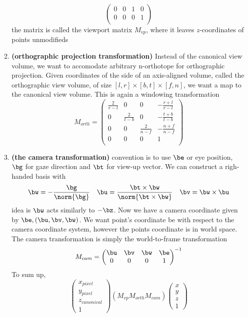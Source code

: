 \documentclass[11pt]{article}
\newcommand{\bheading}[1]{\textbf{(#1)}}
\begin{document}
\begin{enumerate}
\[\begin{pmatrix}
            0 & 0 & 1 & 0 \\
            0 & 0 & 0 & 1 \\
        \end{pmatrix}
    \]
    the matrix is called the viewport matrix $M_{vp}$, where it leaves $z$-coordinates of points unmodifieds
    \item \bheading{orthographic projection transformation} Instead of the canonical view volume, we want to accomodate arbitrary n-orthotope for orthographic projection. Given coordinates of the side of an axis-aligned volume, called the orthographic view volume, of size $[l,r] \times [b,t] \times [f,n]$, we want a map to the canonical view volume. This is again a windowing transformation
    \[
        M_{orth} = 
        \begin{pmatrix}
            \frac{2}{r-l} & 0 & 0 & -\frac{r+l}{r-l} \\
            0 & \frac{2}{t-b} & 0 & -\frac{t+b}{t-b} \\
            0 & 0 & \frac{2}{n-f} & -\frac{n+f}{n-f} \\
            0 & 0 & 0 & 1 \\
        \end{pmatrix}
    \]
    \item \bheading{the camera transformation} convention is to use $\be$ or eye position, $\bg$ for gaze direction and $\bt$ for view-up vector. We can construct a righ-handed basis with 
    \[
        \bw = -\frac{\bg}{\norm{\bg}}
        \quad 
        \bu = \frac{\bt \times \bw}{\norm{\bt \times \bw}}
        \quad
        \bv = \bw \times \bu
    \]
    idea is $\bw$ acts similarly to $-\bz$. Now we have a camera coordinate given by $\be, (\bu,\bv,\bw)$. We want point's coordinate be with respect to the camera coordinate system, however the points coordinate is in world space. The camera transformation is simply the world-to-frame transformation
    \[
        M_{cam} =
        \begin{pmatrix}
            \bu & \bv & \bw & \be \\
            0 & 0 & 0 & 1 \\
        \end{pmatrix}^{-1}
    \]
    To sum up, 
    \[
        \begin{pmatrix}
            x_{pixel} \\ y_{pixel} \\ z_{canonical} \\ 1
        \end{pmatrix}
        (M_{vp} M_{orth} M_{cam})
        \begin{pmatrix}
            x \\ y \\ z \\ 1
        \end{pmatrix}
    \]
\end{enumerate}
\end{document}
